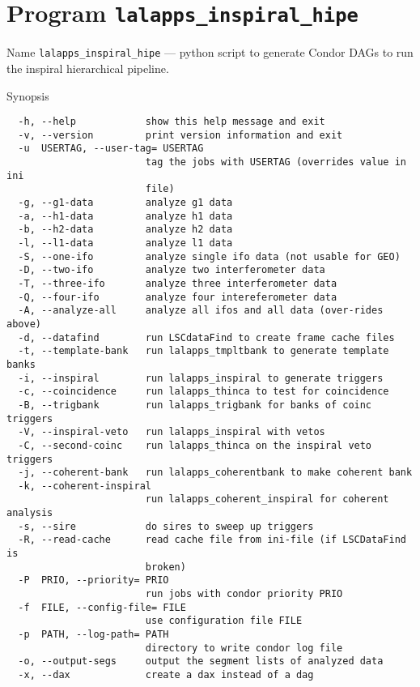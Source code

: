 \section{Program \texttt{lalapps\_inspiral\_hipe}}
\label{program:inspiral-hipe}

\begin{entry}
\item[Name]
\verb$lalapps_inspiral_hipe$ --- python script to generate Condor DAGs to
run the inspiral hierarchical pipeline.

\item[Synopsis]
\begin{verbatim}
  -h, --help            show this help message and exit
  -v, --version         print version information and exit
  -u  USERTAG, --user-tag= USERTAG
                        tag the jobs with USERTAG (overrides value in ini
                        file)
  -g, --g1-data         analyze g1 data
  -a, --h1-data         analyze h1 data
  -b, --h2-data         analyze h2 data
  -l, --l1-data         analyze l1 data
  -S, --one-ifo         analyze single ifo data (not usable for GEO)
  -D, --two-ifo         analyze two interferometer data
  -T, --three-ifo       analyze three interferometer data
  -Q, --four-ifo        analyze four intereferometer data
  -A, --analyze-all     analyze all ifos and all data (over-rides above)
  -d, --datafind        run LSCdataFind to create frame cache files
  -t, --template-bank   run lalapps_tmpltbank to generate template banks
  -i, --inspiral        run lalapps_inspiral to generate triggers
  -c, --coincidence     run lalapps_thinca to test for coincidence
  -B, --trigbank        run lalapps_trigbank for banks of coinc triggers
  -V, --inspiral-veto   run lalapps_inspiral with vetos
  -C, --second-coinc    run lalapps_thinca on the inspiral veto triggers
  -j, --coherent-bank   run lalapps_coherentbank to make coherent bank
  -k, --coherent-inspiral
                        run lalapps_coherent_inspiral for coherent analysis
  -s, --sire            do sires to sweep up triggers
  -R, --read-cache      read cache file from ini-file (if LSCDataFind is
                        broken)
  -P  PRIO, --priority= PRIO
                        run jobs with condor priority PRIO
  -f  FILE, --config-file= FILE
                        use configuration file FILE
  -p  PATH, --log-path= PATH
                        directory to write condor log file
  -o, --output-segs     output the segment lists of analyzed data
  -x, --dax             create a dax instead of a dag
\end{verbatim}


\end{entry}
